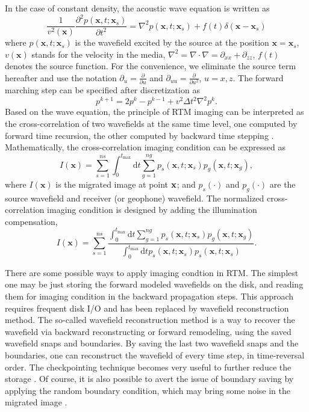 In the case of constant density, the acoustic wave equation is written as
\begin{equation}\label{eq:scalar_wav}
\frac{1}{v^2(\textbf{x})}\frac{\partial^2 p(\textbf{x},t;\textbf{x}_s)}{\partial t^2}=\nabla^2 p(\textbf{x},t;\textbf{x}_s)+f(t)\delta(\textbf{x}-\textbf{x}_s)
\end{equation}
where $p(\textbf{x},t;\textbf{x}_s)$ is the wavefield excited by the source at the position $\textbf{x}=\textbf{x}_s$,  $v(\textbf{x})$ stands for the velocity in the media, $\nabla^2=\nabla\cdot\nabla=\partial_{xx}+\partial_{zz}$, $f(t)$ denotes the source function. For the convenience, we eliminate the source term hereafter and use the notation $\partial_u=\frac{\partial}{\partial u}$ and $\partial_{uu}=\frac{\partial}{\partial u^2}$, $u=x,z$. The forward marching step can be specified after discretization as
\begin{equation}\label{eq:forward}
p^{k+1}=2p^{k}-p^{k-1}+v^2\Delta t^2 \nabla^2 p^{k}.
\end{equation}
Based on the wave equation, the principle of RTM imaging can be interpreted as the cross-correlation of two wavefields at the same time level, one computed by forward time recursion, the other computed by backward time stepping \citep{symes2007reverse}.
 Mathematically, the cross-correlation imaging condition can be expressed as
\begin{equation}
I(\textbf{x})=\sum_{s=1}^{ns}\int_{0}^{t_{\max}}\mathrm{d}t \sum_{g=1}^{ng} p_s(\textbf{x},t;\textbf{x}_s)p_g(\textbf{x},t;\textbf{x}_g),
\end{equation}
where $I(\textbf{x})$ is the migrated image at point ${\bf x}$; and $p_s(\cdot)$ and $p_g(\cdot)$ are the source wavefield and receiver (or geophone) wavefield. The normalized cross-correlation imaging condition is designed by adding  the illumination compensation,
\begin{equation}
I(\textbf{x})=\sum_{s=1}^{ns}\frac{\int_{0}^{t_{\max}}\mathrm{d}t\sum_{g=1}^{ng} p_s(\textbf{x},t;\textbf{x}_s)p_g(\textbf{x},t;\textbf{x}_g)}{\int_{0}^{t_{\max}}\mathrm{d}t p_s(\textbf{x},t;\textbf{x}_s)p_s(\textbf{x},t;\textbf{x}_s)}.
\end{equation}


There are some possible ways to apply imaging condtion in RTM. The simplest one may be just storing the forward modeled wavefields on the disk, and reading them for imaging condition in the backward propagation steps. This approach requires frequent disk I/O and has been replaced by wavefield reconstruction method. The so-called wavefield reconstruction method is a way to recover the wavefield via backward reconstructing or forward remodeling, using the saved wavefield snaps and boundaries. By saving the last two wavefield snaps and the boundaries, one can reconstruct the wavefield of every time step, in time-reversal order. The checkpointing technique becomes very useful to further reduce the storage \citep{symes2007reverse,dussaud2008computational}. Of course, it is also possible to avert the issue of boundary saving by applying the random boundary condition, which may bring some noise in the migrated image \citep{clapp2009reverse,clapp2010selecting,liu2013wavefield,liu20133d}.


